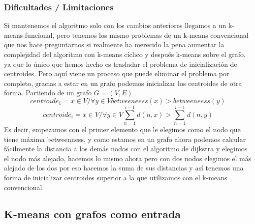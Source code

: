 \documentclass[12pt,a4paper]{article}
\begin{document}
			\subsubsection{Dificultades / Limitaciones}
			Si mantenemos el algoritmo solo con los cambios anteriores llegamos a un k-means funcional, pero tenemos los mismo problemas de un k-means convencional que nos hace preguntarnos si realmente ha merecido la pena aumentar la complejidad del algoritmo con k-means cíclico y después k-means sobre el grafo, ya que lo único que hemos hecho es trasladar el problema de inicialización de centroides. Pero aquí viene un proceso que puede eliminar el problema por completo, gracias a estar en un grafo podemos inicializar los centroides de otra forma. Partiendo de un grafo $G=(V,E)$\\
			\[ centroide_1 = x \in V/ \forall y \in V betweeneess(x) > betweeneess(y) \]
			\[ centroide_i = x\in V/ \forall y \in V \sum_{n=1}^{i-1}d(n,x) > \sum_{n=1}^{i-1}d(n,y) \]
			Es decir, empezamos con el primer elemento que le elegimos como el nodo que tiene máxima betweenness, y como estamos en un grafo ahora podemos calcular fácilmente la distancia a los demás nodos con el algoritmo de dijkstra y elegimos el nodo más alejado, hacemos lo mismo ahora pero con dos nodos elegimos el más alejado de los dos por eso hacemos la suma de sus distancias y así tenemos una forma de inicializar centroides superior a la que utilizamos con el k-means convencional.\\
\pagebreak
\subsection{K-means con grafos como entrada}
\end{document}
